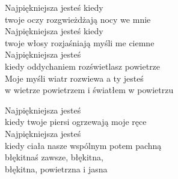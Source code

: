 
\begin{text}
    Najpiękniejsza jesteś kiedy\\
    twoje oczy rozgwieżdżają nocy we mnie\\
    Najpiękniejsza jesteś kiedy\\
    twoje włosy rozjaśniają myśli me ciemne\\
    Najpiękniejsza jesteś\\
    kiedy oddychaniem rozświetlasz powietrze\\
    Moje myśli wiatr rozwiewa a ty jesteś\\
    w wietrze powietrzem i światłem w powietrzu

    Najpiękniejsza jesteś\\
    kiedy twoje piersi ogrzewają moje ręce\\
    Najpiękniejsza jesteś\\
    kiedy ciała nasze wspólnym potem pachną\\
    błękitnaś zawsze, błękitna,\\
    błękitna, powietrzna i jasna
\end{text}
\begin{chord}

\end{chord}